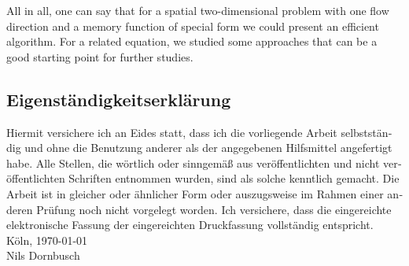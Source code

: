 \documentclass[12pt,a4paper,twoside, open=right]{scrreprt}
\theoremstyle{definition}
\theoremstyle{plain}
\begin{document}
\par 
All in all, one can say that for a spatial two-dimensional problem with one flow direction and a memory function of special form we could present an efficient algorithm. For a related equation, we studied some approaches that can be a good starting point for further studies.
\setcounter{lofdepth}{2}
\listoffigures
\newpage
{}
\setcounter{lofdepth}{2}
\listoftables
\newpage
{}

{}
\newpage
\begin{otherlanguage}{ngerman}
\chapter*{Eigenständigkeitserklärung}
Hiermit versichere ich an Eides statt, dass ich die vorliegende Arbeit selbstständig und ohne die Benutzung anderer als der angegebenen  Hilfsmittel  angefertigt  habe.  
Alle  Stellen,  die  wörtlich  oder  sinngemäß  aus  veröffentlichten  und  nicht  veröffentlichten  Schriften  entnommen  wurden,  sind  als  solche  kenntlich  gemacht.  
Die  Arbeit  ist  in  gleicher  oder  ähnlicher  Form  oder  auszugsweise  im  Rahmen  einer  anderen  Prüfung  noch  nicht  vorgelegt  worden. 
Ich  versichere,  dass  die  eingereichte    elektronische    Fassung    der    eingereichten    Druckfassung    vollständig    entspricht.
\\[\bigskipamount]
Köln, \today
\\[2\bigskipamount]
Nils Dornbusch
\end{otherlanguage}
\end{document}
